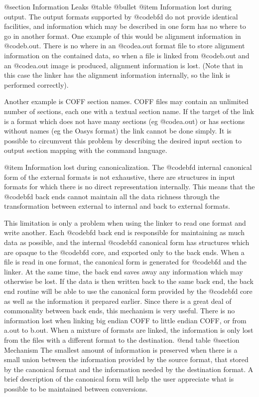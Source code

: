 @section Information Leaks
@table @bullet{}
@item Information lost during output.
The output formats supported by @code{bfd} do not provide identical 
facilities, and information which may be described in one form 
has no where to go in another format. One example of this would be
alignment information in @code{b.out}. There is no where in an @code{a.out}
format file to store alignment information on the contained data, so when
a file is linked from @code{b.out} and an @code{a.out} image is produced,
alignment information is lost. (Note that in this case the linker has the
alignment information internally, so the link is performed correctly). 

Another example is COFF section names. COFF files may contain an
unlimited number of sections, each one with a textual section name. If
the target of the link is a format which does not have many sections
(eg @code{a.out}) or has sections without names (eg the Oasys format)
the link cannot be done simply. It is possible to circumvent this
problem by describing the desired input section to output section
mapping with the command language.

@item Information lost during canonicalization.  
The @code{bfd}
internal canonical form of the external formats is not exhaustive,
there are structures in input formats for which there is no direct
representation internally.  This means that the @code{bfd} back ends
cannot maintain all the data richness through the transformation
between external to internal and back to external formats.

This limitation is only a problem when using the linker to read one
format and write another. Each @code{bfd} back end is responsible for
maintaining as much data as possible, and the internal @code{bfd}
canonical form has structures which are opaque to the @code{bfd} core,
and exported only to the back ends. When a file is read in one format,
the canonical form is generated for @code{bfd} and the linker. At the
same time, the back end saves away any information which may otherwise
be lost. If the data is then written back to the same back end, the
back end routine will be able to use the canonical form provided by
the @code{bfd} core as well as the information it prepared earlier.
Since there is a great deal of commonality between back ends, this
mechanism is very useful. There is no information lost when linking
big endian COFF to little endian COFF, or from a.out to b.out. When a
mixture of formats are linked, the information is only lost from the
files with a different format to the destination.  
@end table 
@section Mechanism 
The smallest amount of information is preserved when there
is a small union between the information provided by the source
format, that stored by the canonical format and the information needed
by the destination format. A brief description of the canonical form
will help the user appreciate what is possible to be maintained
between conversions.

